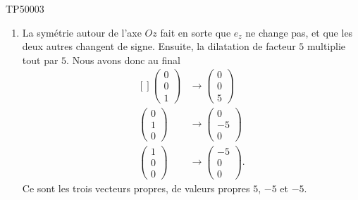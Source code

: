 \begin{corrige}{TP50003}
\begin{enumerate}
		\item
		      La symétrie autour de l'axe $Oz$ fait en sorte que $e_z$ ne change pas, et que les deux autres changent de signe. Ensuite, la dilatation de facteur $5$ multiplie tout par $5$. Nous avons donc au final
		      \begin{equation}
			      \begin{aligned}[]
				      \begin{pmatrix}
					      0 \\
					      0 \\
					      1
				      \end{pmatrix} & \to\begin{pmatrix}
					                         0 \\
					                         0 \\
					                         5
				                         \end{pmatrix} \\
				      \begin{pmatrix}
					      0 \\
					      1 \\
					      0
				      \end{pmatrix} & \to
				      \begin{pmatrix}
					      0  \\
					      -5 \\
					      0
				      \end{pmatrix}                    \\
				      \begin{pmatrix}
					      1 \\
					      0 \\
					      0
				      \end{pmatrix} & \to\begin{pmatrix}
					                         -5 \\
					                         0  \\
					                         0
				                         \end{pmatrix}.
			      \end{aligned}
		      \end{equation}
		      Ce sont les trois vecteurs propres, de valeurs propres $5$, $-5$ et $-5$.

	\end{enumerate}


\end{corrige}
